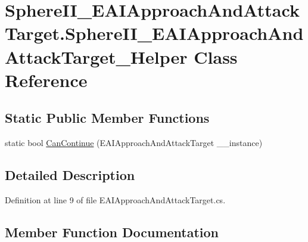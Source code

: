 \hypertarget{class_sphere_i_i___e_a_i_approach_and_attack_target_1_1_sphere_i_i___e_a_i_approach_and_attack_target___helper}{}\section{Sphere\+I\+I\+\_\+\+E\+A\+I\+Approach\+And\+Attack\+Target.\+Sphere\+I\+I\+\_\+\+E\+A\+I\+Approach\+And\+Attack\+Target\+\_\+\+Helper Class Reference}
\label{class_sphere_i_i___e_a_i_approach_and_attack_target_1_1_sphere_i_i___e_a_i_approach_and_attack_target___helper}
\subsection*{Static Public Member Functions}
\begin{DoxyCompactItemize}
\item 
static bool \mbox{\hyperlink{class_sphere_i_i___e_a_i_approach_and_attack_target_1_1_sphere_i_i___e_a_i_approach_and_attack_target___helper_acfe828c94230e5c813b2adf93d07ccd1}{Can\+Continue}} (E\+A\+I\+Approach\+And\+Attack\+Target \+\_\+\+\_\+instance)
\end{DoxyCompactItemize}


\subsection{Detailed Description}


Definition at line 9 of file E\+A\+I\+Approach\+And\+Attack\+Target.\+cs.



\subsection{Member Function Documentation}
\mbox{\label{class_sphere_i_i___e_a_i_approach_and_attack_target_1_1_sphere_i_i___e_a_i_approach_and_attack_target___helper_acfe828c94230e5c813b2adf93d07ccd1}} 
